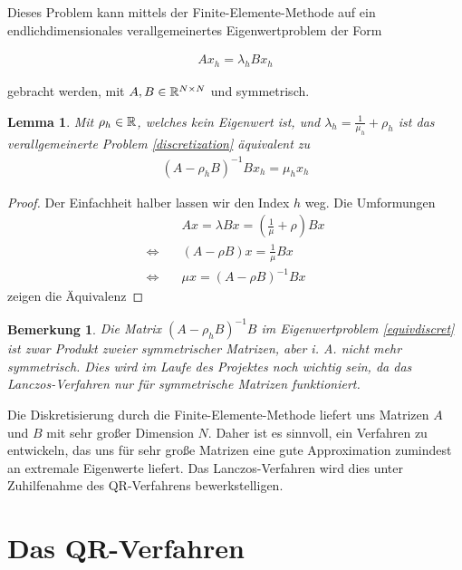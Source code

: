 \documentclass{article}
\theoremstyle{plain}
\newtheorem{lemma}      [theorem]{Lemma}
\newtheorem{remark}     [theorem]{Bemerkung}
\begin{document}
Dieses Problem kann mittels der Finite-Elemente-Methode auf ein endlichdimensionales verallgemeinertes Eigenwertproblem der Form

\begin{align} \label{discretization}
	A x_h = \lambda_h B x_h
\end{align}

gebracht werden, mit $A, B \in \mathbb{R}^{N \times N}$ und symmetrisch.

\begin{lemma}\label{lemma_1_3}
	Mit $\rho_h \in \mathbb{R}$, welches kein Eigenwert ist, und $\lambda_h = \frac{1}{\mu_h} + \rho_h$ ist das verallgemeinerte Problem \eqref{discretization} äquivalent  zu
	\begin{align} \label{equivdiscret}
		(A - \rho_h B)^{-1} B x_h = \mu_h x_h
	\end{align}
\end{lemma}

\begin{proof}
	Der Einfachheit halber lassen wir den Index $h$ weg. Die Umformungen
	\begin{align*}
		&A x = \lambda B x = (\frac{1}{\mu} + \rho) B x \\
		\Leftrightarrow \quad &(A - \rho B)x = \frac{1}{\mu} B x \\
		\Leftrightarrow \quad &\mu x = (A - \rho B)^{-1}B x
	\end{align*}
	zeigen die Äquivalenz
\end{proof}

\begin{remark}\label{remark_1_4}
	Die Matrix $(A - \rho_h B)^{-1} B$ im Eigenwertproblem \eqref{equivdiscret} ist zwar Produkt zweier symmetrischer Matrizen, aber i. A. nicht mehr symmetrisch. Dies wird im Laufe des Projektes noch wichtig sein, da das Lanczos-Verfahren nur für symmetrische Matrizen funktioniert.
\end{remark}

Die Diskretisierung durch die Finite-Elemente-Methode liefert uns Matrizen $A$ und $B$ mit sehr großer Dimension $N$. Daher ist es sinnvoll, ein Verfahren zu entwickeln, das uns für sehr große Matrizen eine gute Approximation zumindest an extremale Eigenwerte liefert. Das Lanczos-Verfahren wird dies unter Zuhilfenahme des QR-Verfahrens bewerkstelligen.

\section{Das QR-Verfahren}\label{section_QR}
\end{document}
